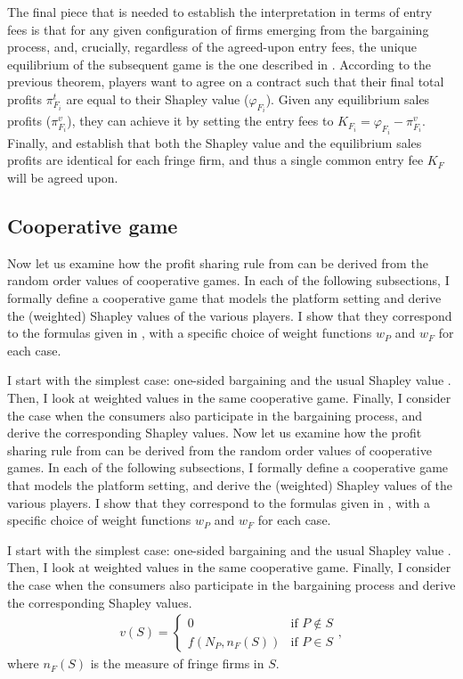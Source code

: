 The final piece that is needed to establish the interpretation in terms of entry fees is that for any given configuration of firms emerging from the bargaining process, and, crucially, regardless of the agreed-upon entry fees, the unique equilibrium of the subsequent game is the one described in .
According to the previous theorem, players want to agree on a contract such that their final total profits $\pi^t_{F_i}$ are equal to their Shapley value ($\varphi_{F_i}$).
Given any equilibrium sales profits ($\pi^v_{F_i}$), they can achieve it by setting the entry fees to $K_{F_i} = \varphi_{F_i} - \pi^v_{F_i}$.
Finally,  and  establish that both the Shapley value and the equilibrium sales profits are identical for each fringe firm, and thus a single common entry fee $K_F$ will be agreed upon.

\subsection{Cooperative game}
\label{sec:cooperative_game}

Now let us examine how the profit sharing rule from  can be derived from the random order values of cooperative games.
In each of the following subsections, I formally define a cooperative game that models the platform setting and derive the (weighted) Shapley values of the various players.
I show that they correspond to the formulas given in , with a specific choice of weight functions $w_P$ and $w_F$ for each case.

I start with the simplest case: one-sided bargaining and the usual Shapley value \parencite{shapley1953additive}.
Then, I look at weighted values \parencite{weber1988probabilistic} in the same cooperative game.
Finally, I consider the case when the consumers also participate in the bargaining process, and derive the corresponding Shapley values.
Now let us examine how the profit sharing rule from  can be derived from the random order values of cooperative games.
In each of the following subsections, I formally define a cooperative game that models the platform setting, and derive the (weighted) Shapley values of the various players.
I show that they correspond to the formulas given in , with a specific choice of weight functions $w_P$ and $w_F$ for each case.

I start with the simplest case: one-sided bargaining and the usual Shapley value \parencite{shapley1953additive}.
Then, I look at weighted values \parencite{weber1988probabilistic} in the same cooperative game.
Finally, I consider the case when the consumers also participate in the bargaining process and derive the corresponding Shapley values.
\begin{align*}
    v(S) = \begin{cases}
        0 & \text{if } P \notin S \\
        f(N_P, n_F(S)) & \text{if } P \in S
    \end{cases},
\end{align*}
where $n_F(S)$ is the measure of fringe firms in $S$.

